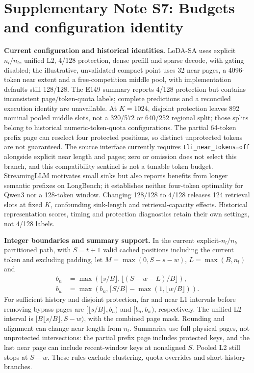 \documentclass[10pt,letterpaper]{article}
\begin{document}
\section*{Supplementary Note S7: Budgets and configuration identity}
\textbf{Current configuration and historical identities.} LoDA-SA uses explicit $n_l/n_b$, unified L2, 4/128 protection, dense prefill and sparse decode, with gating disabled; the illustrative, unvalidated compact point uses 32 near pages, a 4096-token near extent and a free-competition middle pool, with implementation defaults still 128/128. The E149 summary reports 4/128 protection but contains inconsistent page/token-quota labels; complete predictions and a reconciled execution identity are unavailable. At $K=1024$, disjoint protection leaves 892 nominal pooled middle slots, not a 320/572 or 640/252 regional split; those splits belong to historical numeric-token-quota configurations. The partial 64-token prefix page can reselect four protected positions, so distinct unprotected tokens are not guaranteed. The source interface currently requires \texttt{tli\_near\_tokens=off} alongside explicit near length and pages; zero or omission does not select this branch, and this compatibility sentinel is not a tunable token budget. StreamingLLM motivates small sinks but also reports benefits from longer semantic prefixes on LongBench; it establishes neither four-token optimality for Qwen3 nor a 128-token window. Changing 128/128 to 4/128 releases 124 retrieval slots at fixed $K$, confounding sink-length and retrieval-capacity effects. Historical representation scores, timing and protection diagnostics retain their own settings, not 4/128 labels.

\textbf{Integer boundaries and summary support.} In the current explicit-$n_l/n_b$ partitioned path, with $S=t+1$ valid cached positions including the current token and excluding padding, let $M=\max(0,S-s-w)$, $L=\max(B,n_l)$ and
\begin{align*}
b_n&=\max(\lfloor s/B\rfloor,\lfloor(S-w-L)/B\rfloor),\\
b_w&=\max(b_n,\lceil S/B\rceil-\max(1,\lfloor w/B\rfloor)).
\end{align*}
For sufficient history and disjoint protection, far and near L1 intervals before removing bypass pages are $[\lfloor s/B\rfloor,b_n)$ and $[b_n,b_w)$, respectively. The unified L2 interval is $[B\lfloor s/B\rfloor,S-w)$, with the combined page mask. Rounding and alignment can change near length from $n_l$. Summaries use full physical pages, not unprotected intersections: the partial prefix page includes protected keys, and the last near page can include recent-window keys at nonaligned $S$. Pooled L2 still stops at $S-w$. These rules exclude clustering, quota overrides and short-history branches.
\end{document}
